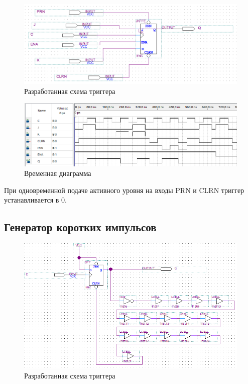 \documentclass[a4paper,12pt]{article}
\begin{document}
    \begin{figure}[H]
		\centering
		\includegraphics[width=\linewidth]{polytech/scheme/report-lab3/subfiles/images/scheme-4}
		\caption{Разработанная схема триггера}
		\label{fig:scheme-4}
	\end{figure}
    \begin{figure}[H]
		\centering
		\includegraphics[width=\linewidth]{polytech/scheme/report-lab3/subfiles/images/wave-4}
		\caption{Временная диаграмма}
		\label{fig:wave-4}
	\end{figure}
    При одновременной подаче активного уровня на входы PRN и CLRN триггер устанавливается в 0.
    \subsection{Генератор коротких импульсов}
    \begin{figure}[H]
		\centering
		\includegraphics[width=\linewidth]{polytech/scheme/report-lab3/subfiles/images/scheme-5}
		\caption{Разработанная схема триггера}
		\label{fig:scheme-5}
	\end{figure}
    
\end{document}
